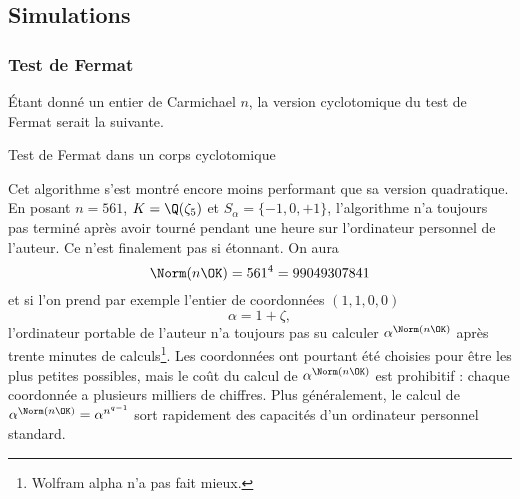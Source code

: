 \subsection{Simulations}

\subsubsection{Test de Fermat}

Étant donné un entier de Carmichael $n$, la version \og cyclotomique \fg{} du test de Fermat serait la suivante.

\vspace{1em}
\begin{algorithm}[H]\label{test-Fermat-cyclotomique}
\caption{Test de Fermat dans un corps cyclotomique}
\end{algorithm}
\vspace{1em}

Cet algorithme s'est montré encore moins performant que sa version quadratique. En posant $n=561$, $K = \Q(\zeta_5)$ et $S_\alpha = \{-1, 0, +1\}$, l'algorithme n'a toujours pas terminé après avoir tourné pendant une heure sur l'ordinateur personnel de l'auteur. Ce n'est finalement pas si étonnant. On aura \[\Norm(n\OK) = 561^4 = 99049307841\] et si l'on prend par exemple l'entier de coordonnées $(1, 1, 0, 0)$ \[\alpha =1 + \zeta,\] l'ordinateur portable de l'auteur n'a toujours pas su calculer $\alpha^{\Norm(n\OK)}$ après trente minutes de calculs\footnote{Wolfram alpha n'a pas fait mieux.}. Les coordonnées ont pourtant été choisies pour être les plus petites possibles, mais le coût du calcul de $\alpha^{\Norm(n\OK)}$ est prohibitif : chaque coordonnée a plusieurs milliers de chiffres. Plus généralement, le calcul de $\alpha^{\Norm(n\OK)} = \alpha^{n^{q-1}}$ sort rapidement des capacités d'un ordinateur personnel standard.

